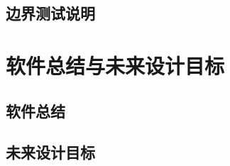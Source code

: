 \subsection{边界测试说明}

\newpage
\section{软件总结与未来设计目标}

\subsection{软件总结}





\subsection{未来设计目标}






